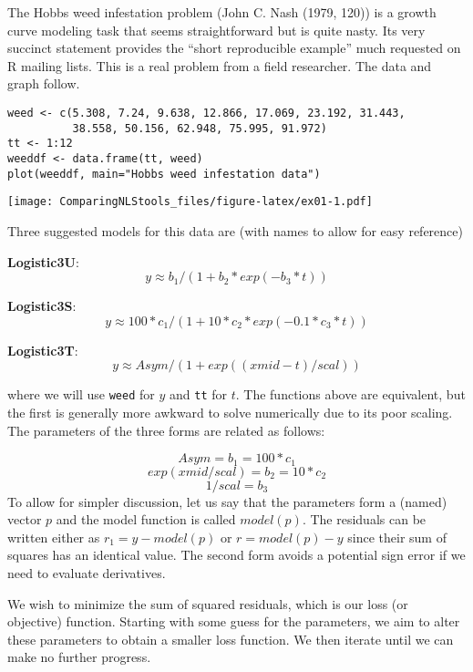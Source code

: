 The Hobbs weed infestation problem (John C. Nash (1979, 120)) is a growth curve modeling
task that seems straightforward but is quite nasty. Its very succinct statement
provides the ``short reproducible example'' much requested on R mailing lists.
This is a real problem from a field researcher. The data and graph follow.

\begin{verbatim}
weed <- c(5.308, 7.24, 9.638, 12.866, 17.069, 23.192, 31.443,
          38.558, 50.156, 62.948, 75.995, 91.972)
tt <- 1:12
weeddf <- data.frame(tt, weed)
plot(weeddf, main="Hobbs weed infestation data")
\end{verbatim}

\texttt{[image: ComparingNLStools\_files/figure-latex/ex01-1.pdf]}

Three suggested models for this data are (with names to allow for easy reference)

\textbf{Logistic3U}:
\[  y \approx  b_1 / (1 + b_2 * exp(- b_3 * t)) \]

\textbf{Logistic3S}:
\[ y \approx  100 * c_1 / (1 + 10 * c_2 * exp(- 0.1 * c_3 * t)) \]

\textbf{Logistic3T}:
\[ y \approx Asym / (1 + exp((xmid - t)/scal)) \]

where we will use \texttt{weed} for \(y\) and \texttt{tt} for \(t\).
The functions above are equivalent, but the first is generally more awkward
to solve numerically due to its poor scaling. The parameters of the three forms
are related as follows:

\[   Asym =  b_1 = 100 * c_1 \]
\[ exp(xmid/scal)  =  b_2 = 10 * c_2 \]
\[ 1/scal  =  b_3 \]
To allow for simpler discussion, let us say that the parameters form a (named) vector
\(p\) and the model function is called \(model(p)\). The residuals can be written
either as \(r_1 = y - model(p)\) or \(r = model(p) - y\)
since their sum of squares has an identical value. The second form
avoids a potential sign error if we need to evaluate derivatives.

We wish to minimize the sum of squared residuals, which is our loss (or objective) function.
Starting with some guess for the parameters, we aim to alter these parameters to obtain a smaller
loss function. We then iterate until we can make no further progress.

